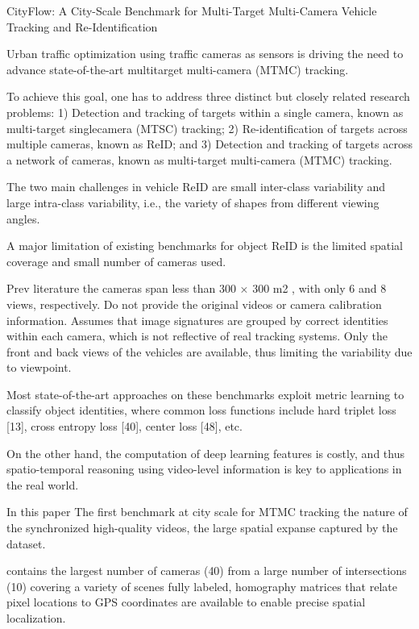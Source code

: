CityFlow: A City-Scale Benchmark for Multi-Target
Multi-Camera Vehicle Tracking and Re-Identification \cite{Tang_2019_CVPR}

Urban traffic optimization using traffic cameras as sensors is driving the need to advance state-of-the-art multitarget multi-camera (MTMC) tracking. 

To achieve this goal, one has to address three distinct but closely related research problems: 1) Detection and tracking of targets within a single camera, known as multi-target singlecamera (MTSC) tracking; 2) Re-identification of targets
across multiple cameras, known as ReID; and 3) Detection
and tracking of targets across a network of cameras, known
as multi-target multi-camera (MTMC) tracking. 


The two main challenges in vehicle
ReID are small inter-class variability and large intra-class
variability, i.e., the variety of shapes from different viewing
angles.

A major limitation of existing benchmarks for object
ReID is the limited spatial coverage and small number of cameras used.


Prev literature
	the cameras span less than 300 × 300 m2 ,
with only 6 and 8 views, respectively. 
	Do not provide the original videos or
camera calibration information. 
	Assumes that image signatures
are grouped by correct identities within each camera, which
is not reflective of real tracking systems. 
	Only the front and back views of the
vehicles are available, thus limiting the variability due to
viewpoint. 
	
	Most state-of-the-art approaches on these
benchmarks exploit metric learning to classify object identities, where common loss functions include hard triplet
loss [13], cross entropy loss [40], center loss [48], etc.
	
	On the other hand, the computation of deep learning features is costly, and thus spatio-temporal reasoning using
video-level information is key to applications in the real
world. 
	

In this paper
The first
benchmark at city scale for MTMC tracking
the nature of the synchronized high-quality videos,
the large spatial expanse captured by the
dataset. 

contains the largest number of cameras (40) from a large
number of intersections (10) 
covering a variety of scenes 
fully labeled, homography matrices that relate pixel
locations to GPS coordinates are available to enable precise spatial localization. 


